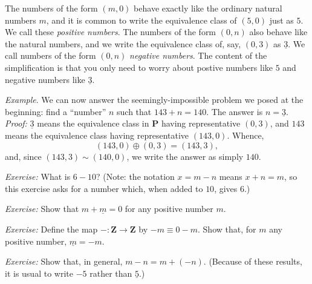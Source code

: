 \documentclass[10pt, a4paper, twocolumn]{article}
\newcommand{\set}[1]{\mathbold{#1}}
\newcommand{\pairs}{\set{P}}
\newcommand{\minus}[1]{\underline{#1}}
\begin{document}
The numbers of the form $(m,0)$ behave exactly like the ordinary
natural numbers $m$, and it is common to write the equivalence class
of $(5,0)$ just as $5$. We call these \emph{positive numbers}. The
numbers of the form $(0,n)$ also behave like the natural numbers, and
we write the equivalence class of, say, $(0,3)$ as $\minus{3}$. We
call numbers of the form $(0,n)$ \emph{negative numbers}. The content
of the simplification is that you only need to worry about postive
numbers like $5$ and negative numbers like $\minus{3}$.

\emph{Example}. We can now answer the seemingly-impossible problem we
posed at the beginning: find a ``number'' $n$ such that
$143+n=140$. The answer is $n=\minus{3}$. \emph{Proof:} $\minus{3}$
means the equivalence class in $\pairs$ having representative $(0,3)$,
and $143$ means the equivalence class having representative
$(143,0)$. Whence,
\begin{equation*}
(143,0) \oplus (0,3) = (143,3),
\end{equation*}
and, since $(143,3)\sim(140,0)$, we write the answer as simply $140$.

\emph{Exercise:} What is $6-10$? (Note: the notation $x = m - n$ means
$x+n=m$, so this exercise asks for a number which, when added to $10$,
gives $6$.)

\emph{Exercise:} Show that $m+\minus{m}=0$ for any positive number $m$.

\emph{Exercise:} Define the map $-:\set{Z}\to\set{Z}$ by $-m\equiv 0-m$. Show
that, for $m$ any positive number, $\minus{m}=-m$. 

\emph{Exercise:} Show that, in general, $m-n=m+(-n)$. (Because of these
results, it is usual to write $-5$ rather than $\minus{5}$.)
\end{document}
